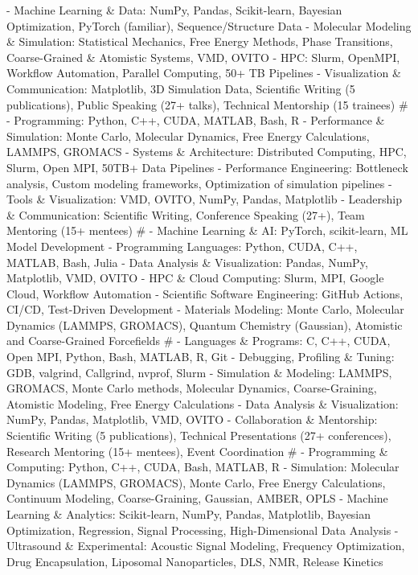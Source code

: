 - Machine Learning \& Data: NumPy, Pandas, Scikit-learn, Bayesian Optimization, PyTorch (familiar), Sequence/Structure Data
- Molecular Modeling \& Simulation: Statistical Mechanics, Free Energy Methods, Phase Transitions, Coarse-Grained \& Atomistic Systems, VMD, OVITO
- HPC: Slurm, OpenMPI, Workflow Automation, Parallel Computing, 50+ TB Pipelines
- Visualization \& Communication: Matplotlib, 3D Simulation Data, Scientific Writing (5 publications), Public Speaking (27+ talks), Technical Mentorship (15 trainees)
#
- Programming: Python, C++, CUDA, MATLAB, Bash, R
- Performance \& Simulation: Monte Carlo, Molecular Dynamics, Free Energy Calculations, LAMMPS, GROMACS
- Systems \& Architecture: Distributed Computing, HPC, Slurm, Open MPI, 50TB+ Data Pipelines
- Performance Engineering: Bottleneck analysis, Custom modeling frameworks, Optimization of simulation pipelines
- Tools \& Visualization: VMD, OVITO, NumPy, Pandas, Matplotlib
- Leadership \& Communication: Scientific Writing, Conference Speaking (27+), Team Mentoring (15+ mentees)  
#
- Machine Learning \& AI: PyTorch, scikit-learn, ML Model Development
- Programming Languages: Python, CUDA, C++, MATLAB, Bash, Julia
- Data Analysis \& Visualization: Pandas, NumPy, Matplotlib, VMD, OVITO
- HPC \& Cloud Computing: Slurm, MPI, Google Cloud, Workflow Automation
- Scientific Software Engineering: GitHub Actions, CI/CD, Test-Driven Development
- Materials Modeling: Monte Carlo, Molecular Dynamics (LAMMPS, GROMACS), Quantum Chemistry (Gaussian), Atomistic and Coarse-Grained Forcefields
#
- Languages \& Programs: C, C++, CUDA, Open MPI, Python, Bash, MATLAB, R, Git
- Debugging, Profiling \& Tuning: GDB, valgrind, Callgrind, nvprof, Slurm
- Simulation \& Modeling: LAMMPS, GROMACS, Monte Carlo methods, Molecular Dynamics, Coarse-Graining, Atomistic Modeling, Free Energy Calculations
- Data Analysis \& Visualization: NumPy, Pandas, Matplotlib, VMD, OVITO
- Collaboration \& Mentorship: Scientific Writing (5 publications), Technical Presentations (27+ conferences), Research Mentoring (15+ mentees), Event Coordination
#
- Programming \& Computing: Python, C++, CUDA, Bash, MATLAB, R
- Simulation: Molecular Dynamics (LAMMPS, GROMACS), Monte Carlo, Free Energy Calculations, Continuum Modeling, Coarse-Graining, Gaussian, AMBER, OPLS
- Machine Learning \& Analytics: Scikit-learn, NumPy, Pandas, Matplotlib, Bayesian Optimization, Regression, Signal Processing, High-Dimensional Data Analysis
- Ultrasound \& Experimental: Acoustic Signal Modeling, Frequency Optimization, Drug Encapsulation, Liposomal Nanoparticles, DLS, NMR, Release Kinetics
